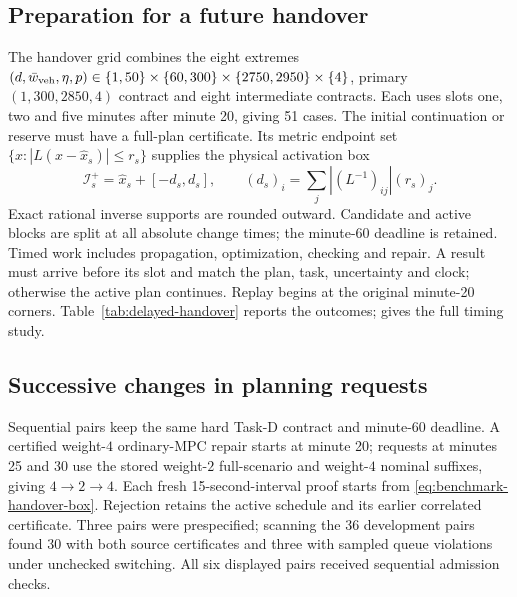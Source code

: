 \subsection{Preparation for a future handover}
\label{supp:detail:sec:delayed-handover-results}
The handover grid combines the eight extremes
$(d,\bar w_{\rm veh},\eta,p)\in\{1,50\}\times\{60,300\}\times
\{2750,2950\}\times\{4\}$, primary $(1,300,2850,4)$ contract and eight
intermediate contracts. Each uses slots one, two and five minutes after
minute 20, giving 51 cases. The initial continuation or reserve must have
a full-plan certificate. Its metric endpoint set
$\{x:|L(x-\widehat x_s)|\le r_s\}$ supplies the physical activation box
\begin{equation}
\mathcal I_s^+=\widehat x_s+[-d_s,d_s],\qquad
(d_s)_i=\sum_j|(L^{-1})_{ij}|(r_s)_j.
\label{eq:benchmark-handover-box}
\end{equation}
Exact rational inverse supports are rounded outward. Candidate and active
blocks are split at all absolute change times; the minute-60 deadline is
retained. Timed work includes propagation, optimization, checking and
repair. A result must arrive before its slot and match the plan, task,
uncertainty and clock; otherwise the active plan continues. Replay begins
at the original minute-20 corners. Table~\ref{tab:delayed-handover} reports
the outcomes;  gives the full timing study.

\subsection{Successive changes in planning requests}
\label{app:sequential-handover}
Sequential pairs keep the same hard Task-D contract and minute-60 deadline.
A certified weight-$4$ ordinary-MPC repair starts at minute 20; requests
at minutes 25 and 30 use the stored weight-$2$ full-scenario and weight-$4$
nominal suffixes, giving $4\to2\to4$. Each fresh 15-second-interval proof
starts from \eqref{eq:benchmark-handover-box}. Rejection retains the active
schedule and its earlier correlated certificate. Three pairs were
prespecified; scanning the 36 development pairs found 30 with both source
certificates and three with sampled queue violations under unchecked
switching. All six displayed pairs received sequential admission checks.

